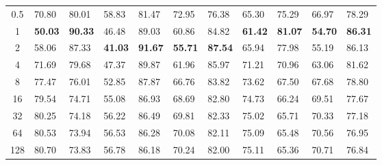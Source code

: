\documentclass{article}
\begin{document}
\begin{table}[h]
{\begin{tabular}{c|C{0.04\textwidth}C{0.05\textwidth}|C{0.04\textwidth}C{0.05\textwidth}|C{0.04\textwidth}C{0.05\textwidth}|C{0.04\textwidth}C{0.05\textwidth}|C{0.04\textwidth}C{0.05\textwidth}}
0.5                                   & 70.80                & 80.01                 & 58.83                & 81.47                 & 72.95                & 76.38                 & 65.30                & 75.29                 & 66.97                & 78.29                \\
1                                     & \textbf{50.03}       & \textbf{90.33}        & 46.48                & 89.03                 & 60.86                & 84.82                 & \textbf{61.42}       & \textbf{81.07}        & \textbf{54.70}       & \textbf{86.31}       \\
2                                     & 58.06                & 87.33                 & \textbf{41.03}       & \textbf{91.67}        & \textbf{55.71}       & \textbf{87.54}        & 65.94                & 77.98                 & 55.19                & 86.13                \\
4                                     & 71.69                & 79.68                 & 47.37                & 89.87                 & 61.96                & 85.97                 & 71.21                & 70.96                 & 63.06                & 81.62                \\
8                                     & 77.47                & 76.01                 & 52.85                & 87.87                 & 66.76                & 83.82                 & 73.62                & 67.50                 & 67.68                & 78.80                \\
16                                    & 79.54                & 74.71                 & 55.08                & 86.93                 & 68.69                & 82.80                 & 74.73                & 66.24                 & 69.51                & 77.67                \\
32                                    & 80.25                & 74.18                 & 56.22                & 86.49                 & 69.81                & 82.33                 & 75.02                & 65.71                 & 70.33                & 77.18                \\
64                                    & 80.53                & 73.94                 & 56.53                & 86.28                 & 70.08                & 82.11                 & 75.09                & 65.48                 & 70.56                & 76.95                \\
128                                   & 80.70                & 73.83                 & 56.78                & 86.18                 & 70.24                & 82.00                 & 75.11                & 65.36                 & 70.71                & 76.84                \\

\end{tabular}}
\end{table}
\end{document}
